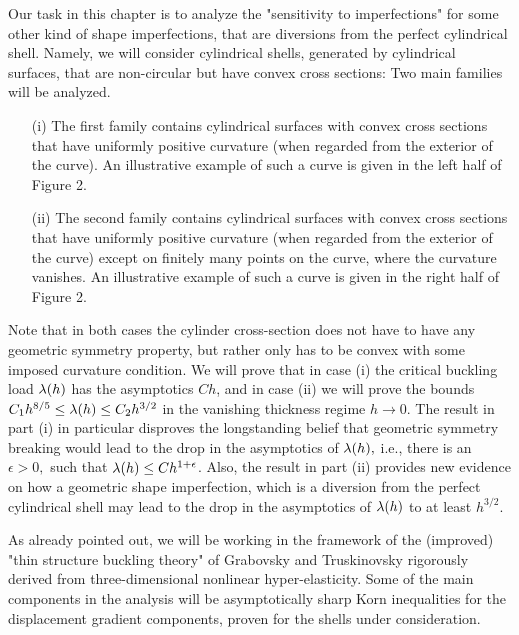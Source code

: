 Our task in this chapter is to analyze the "sensitivity to imperfections" for some other kind of shape imperfections, that are diversions from the perfect cylindrical shell. Namely, we will consider cylindrical shells, generated by cylindrical surfaces, that are non-circular but have convex cross sections: Two main families will be analyzed. 
\begin{itemize}
\item[(i)] The first family contains cylindrical surfaces with convex cross sections that have uniformly positive curvature (when regarded from the exterior of the curve). An illustrative example of such a curve is given in the left half of Figure 2. 
\item[(ii)] The second family contains cylindrical surfaces with convex cross sections that have uniformly positive curvature (when regarded from the exterior of the curve) except on finitely many points on the curve, where the curvature vanishes. An illustrative example of such a curve is given in the right half of Figure 2. 
\end{itemize}





Note that in both cases the cylinder cross-section does not have to have any geometric symmetry property, but rather only has to be convex with some imposed curvature condition. We will prove that in case (i) the critical buckling load $\lambda(h)$ has the asymptotics $Ch$, and in case (ii) we will prove the bounds
 $C_1h^{8/5}\leq \lambda(h)\leq C_2h^{3/2}$ in the vanishing thickness regime $h\to 0.$ The result in part (i) in particular disproves the longstanding belief that geometric symmetry breaking would lead to the drop in the asymptotics of $\lambda(h),$ i.e., there is an $\epsilon>0,$ such that $\lambda(h)\leq Ch^{1+\epsilon}$. Also, the result in part (ii) provides new evidence on how a geometric shape imperfection, which is a diversion from the perfect cylindrical shell may lead to the drop in the asymptotics of $\lambda(h)$ to at least $h^{3/2}.$ 

As already pointed out, we will be working in the framework of the (improved) "thin structure buckling theory" of Grabovsky and Truskinovsky \cite{bib:Gra.Tru.} rigorously derived from three-dimensional nonlinear hyper-elasticity. Some of the main components in the analysis will be asymptotically sharp Korn 
inequalities for the displacement gradient components, proven for the shells under consideration. 

